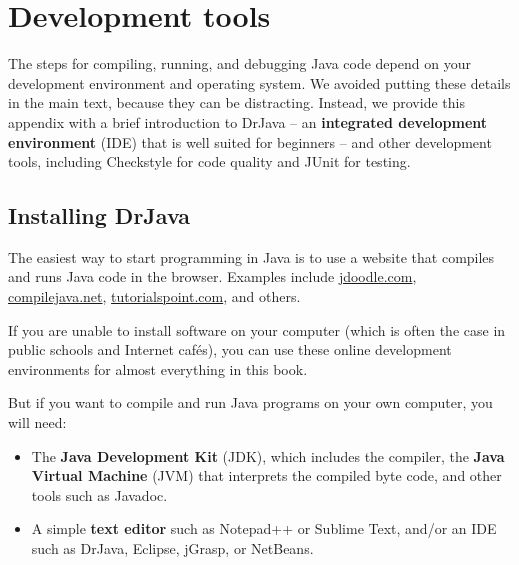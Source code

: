 \documentclass[12pt]{book}
\theoremstyle{exercise}
\begin{document}
\appendix
\renewcommand{\chaptermark}[1]{\markboth{Appendix \thechapter ~~ #1}{}}


\chapter{Development tools}
\label{development}


The steps for compiling, running, and debugging Java code depend on your development environment and operating system.
We avoided putting these details in the main text, because they can be distracting.
Instead, we provide this appendix with a brief introduction to DrJava -- an {\bf integrated development environment} (IDE) that is well suited for beginners -- and other development tools, including Checkstyle for code quality and JUnit for testing.


\section{Installing DrJava}
\label{drjava}

The easiest way to start programming in Java is to use a website that compiles and runs Java code in the browser.
Examples include \url{jdoodle.com}, \url{compilejava.net}, \url{tutorialspoint.com}, and others.

If you are unable to install software on your computer (which is often the case in public schools and Internet caf\'{e}s), you can use these online development environments for almost everything in this book.

But if you want to compile and run Java programs on your own computer, you will need:

\begin{itemize}

\item The {\bf Java Development Kit} (JDK), which includes the compiler, the {\bf Java Virtual Machine} (JVM) that interprets the compiled byte code, and other tools such as Javadoc.



\item A simple {\bf text editor} such as Notepad++ or Sublime Text, and/or an IDE such as DrJava, Eclipse, jGrasp, or NetBeans.

\end{itemize}
\end{document}
